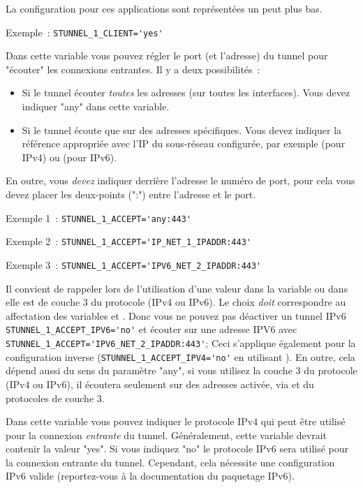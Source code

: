 \begin{description}
La configuration pour ces applications sont représentées un peut plus bas.

Exemple~: \verb+STUNNEL_1_CLIENT='yes'+


Dans cette variable vous pouvez régler le port (et l'adresse) du tunnel pour "écouter"
les connexions entrantes. Il y a deux possibilités~:

\begin{itemize}
\item Si le tunnel écouter \emph{toutes} les adresses (sur toutes les interfaces). Vous devez
indiquer "any" dans cette variable.
\item Si le tunnel écoute que sur des adresses spécifiques. Vous devez indiquer la référence
appropriée avec l'IP du sous-réseau configurée, par exemple  (pour IPv4)
ou  (pour IPv6).
\end{itemize}

En outre, vous \emph{devez} indiquer derrière l'adresse le numéro de port, pour cela vous devez
placer les deux-points (":") entre l'adresse et le port.

Exemple 1~: \verb+STUNNEL_1_ACCEPT='any:443'+

Exemple 2~: \verb+STUNNEL_1_ACCEPT='IP_NET_1_IPADDR:443'+

Exemple 3~: \verb+STUNNEL_1_ACCEPT='IPV6_NET_2_IPADDR:443'+

Il convient de rappeler lors de l'utilisation d'une valeur dans la variable 
ou dans  elle est de couche 3 du protocole (IPv4 ou IPv6). Le choix \emph{doit}
correspondre au affectation des variables  et .
Donc vous ne pouvez pas déactiver un tunnel IPv6 \verb+STUNNEL_1_ACCEPT_IPV6='no'+ et écouter
sur une adresse IPV6 avec \verb+STUNNEL_1_ACCEPT='IPV6_NET_2_IPADDR:443'+; Ceci s'applique
également pour la configuration inverse (\verb+STUNNEL_1_ACCEPT_IPV4='no'+ en utilisant ).
En outre, cela dépend aussi du sens du paramètre "any", si vous utilisez la couche 3 du protocole
(IPv4 ou IPv6), il écoutera seulement sur des adresses activée, via 
et  du protocoles de couche 3.


Dans cette variable vous pouvez indiquer le protocole IPv4 qui peut être utilisé pour la connexion
\emph{entrante} du tunnel. Généralement, cette variable devrait contenir la valeur "yes". Si vous
indiquez "no" le protocole IPv6 sera utilisé pour la connexion entrante du tunnel. Cependant, cela
nécessite une configuration IPv6 valide (reportez-vous à la documentation du paquetage IPv6).


\end{description}

